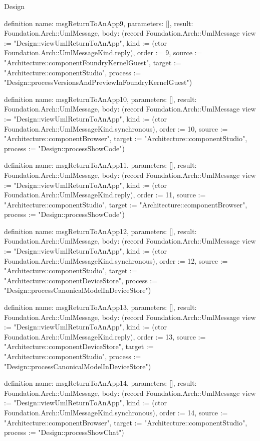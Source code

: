 \begin{lexlean}{Design}
\begin{semanticmodule}
definition{
  name: msgReturnToAnApp9,
  parameters: [],
  result: Foundation.Arch::UmlMessage,
  body: (record Foundation.Arch::UmlMessage {view := "Design::viewUmlReturnToAnApp", kind := (ctor Foundation.Arch::UmlMessageKind.reply), order := 9, source := "Architecture::componentFoundryKernelGuest", target := "Architecture::componentStudio", process := "Design::processVersionsAndPreviewInFoundryKernelGuest"})
}

definition{
  name: msgReturnToAnApp10,
  parameters: [],
  result: Foundation.Arch::UmlMessage,
  body: (record Foundation.Arch::UmlMessage {view := "Design::viewUmlReturnToAnApp", kind := (ctor Foundation.Arch::UmlMessageKind.synchronous), order := 10, source := "Architecture::componentBrowser", target := "Architecture::componentStudio", process := "Design::processShowCode"})
}

definition{
  name: msgReturnToAnApp11,
  parameters: [],
  result: Foundation.Arch::UmlMessage,
  body: (record Foundation.Arch::UmlMessage {view := "Design::viewUmlReturnToAnApp", kind := (ctor Foundation.Arch::UmlMessageKind.reply), order := 11, source := "Architecture::componentStudio", target := "Architecture::componentBrowser", process := "Design::processShowCode"})
}

definition{
  name: msgReturnToAnApp12,
  parameters: [],
  result: Foundation.Arch::UmlMessage,
  body: (record Foundation.Arch::UmlMessage {view := "Design::viewUmlReturnToAnApp", kind := (ctor Foundation.Arch::UmlMessageKind.synchronous), order := 12, source := "Architecture::componentStudio", target := "Architecture::componentDeviceStore", process := "Design::processCanonicalModelInDeviceStore"})
}

definition{
  name: msgReturnToAnApp13,
  parameters: [],
  result: Foundation.Arch::UmlMessage,
  body: (record Foundation.Arch::UmlMessage {view := "Design::viewUmlReturnToAnApp", kind := (ctor Foundation.Arch::UmlMessageKind.reply), order := 13, source := "Architecture::componentDeviceStore", target := "Architecture::componentStudio", process := "Design::processCanonicalModelInDeviceStore"})
}

definition{
  name: msgReturnToAnApp14,
  parameters: [],
  result: Foundation.Arch::UmlMessage,
  body: (record Foundation.Arch::UmlMessage {view := "Design::viewUmlReturnToAnApp", kind := (ctor Foundation.Arch::UmlMessageKind.synchronous), order := 14, source := "Architecture::componentBrowser", target := "Architecture::componentStudio", process := "Design::processShowChat"})
}


\end{semanticmodule}
\end{lexlean}
